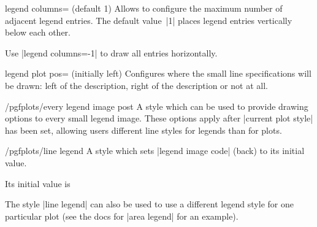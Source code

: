 \begin{pgfplotskey}{legend columns= (default 1)}
Allows to configure the maximum number of adjacent legend entries. The default value~|1| places legend entries vertically below each other. 

Use |legend columns=-1| to draw all entries horizontally.
\end{pgfplotskey}

\begin{pgfplotskey}{legend plot pos= (initially left)}
Configures where the small line specifications will be drawn: left of the description, right of the description or not at all.
\end{pgfplotskey}

\begin{stylekey}{/pgfplots/every legend image post}
	\label{key:legendimagepost}
	A style which can be used to provide drawing options to every small legend image. These options apply after |current plot style| has been set, allowing users different line styles for legends than for plots.
\end{stylekey}


\begin{stylekey}{/pgfplots/line legend}
	A style which sets |legend image code| (back) to its initial value. 

	Its initial value is
\begin{codeexample}
\end{codeexample}

	The style |line legend| can also be used to use a different legend style for one particular plot (see the docs for |area legend| for an example).
\end{stylekey}


